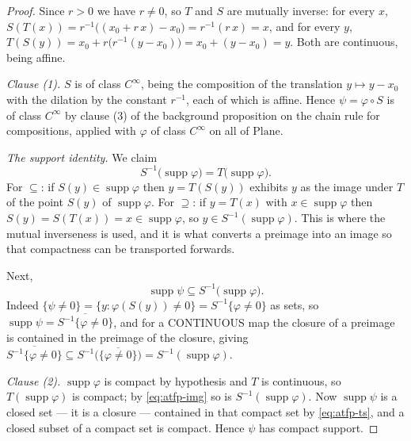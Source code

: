 \begin{proof}
Since $r>0$ we have $r\ne0$, so $T$ and $S$ are mutually inverse: for every $x$,
$S(T(x))=r^{-1}\bigl((x_0+r\,x)-x_0\bigr)=r^{-1}(r\,x)=x$, and for every $y$,
$T(S(y))=x_0+r\bigl(r^{-1}(y-x_0)\bigr)=x_0+(y-x_0)=y$.  Both are continuous, being affine.

\medskip\noindent\emph{Clause (1).}
$S$ is of class $C^{\infty}$, being the composition of the translation $y\mapsto y-x_0$ with the
dilation by the constant $r^{-1}$, each of which is affine.  Hence $\psi=\varphi\circ S$ is of
class $C^{\infty}$ by clause (3) of the background proposition on the chain rule for
compositions, applied with $\varphi$ of class $C^{\infty}$ on all of $\mathrm{Plane}$.

\medskip\noindent\emph{The support identity.}
We claim
\begin{equation}\label{eq:atfp-img}
  S^{-1}\bigl(\operatorname{supp}\varphi\bigr)=T\bigl(\operatorname{supp}\varphi\bigr).
\end{equation}
For $\subseteq$: if $S(y)\in\operatorname{supp}\varphi$ then $y=T(S(y))$ exhibits $y$ as the
image under $T$ of the point $S(y)$ of $\operatorname{supp}\varphi$.  For $\supseteq$: if
$y=T(x)$ with $x\in\operatorname{supp}\varphi$ then $S(y)=S(T(x))=x\in\operatorname{supp}\varphi$,
so $y\in S^{-1}(\operatorname{supp}\varphi)$.  This is where the mutual inverseness is used, and
it is what converts a preimage into an image so that compactness can be transported forwards.

Next,
\begin{equation}\label{eq:atfp-ts}
  \operatorname{supp}\psi\subseteq S^{-1}\bigl(\operatorname{supp}\varphi\bigr).
\end{equation}
Indeed $\{\psi\ne0\}=\{y:\varphi(S(y))\ne0\}=S^{-1}\{\varphi\ne0\}$ as sets, so
$\operatorname{supp}\psi=\overline{S^{-1}\{\varphi\ne0\}}$, and for a CONTINUOUS map the closure
of a preimage is contained in the preimage of the closure, giving
$\overline{S^{-1}\{\varphi\ne0\}}\subseteq S^{-1}\bigl(\overline{\{\varphi\ne0\}}\bigr)
 =S^{-1}(\operatorname{supp}\varphi)$.

\medskip\noindent\emph{Clause (2).}
$\operatorname{supp}\varphi$ is compact by hypothesis and $T$ is continuous, so
$T(\operatorname{supp}\varphi)$ is compact; by \eqref{eq:atfp-img} so is
$S^{-1}(\operatorname{supp}\varphi)$.  Now $\operatorname{supp}\psi$ is a closed set --- it is a
closure --- contained in that compact set by \eqref{eq:atfp-ts}, and a closed subset of a compact
set is compact.  Hence $\psi$ has compact support.


\end{proof}
